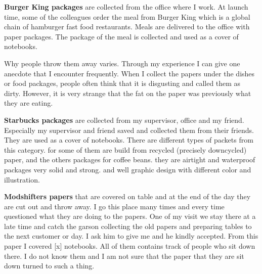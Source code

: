 






\textbf{Burger King packages} are collected from the office where I work. At launch time, some of the colleagues order the meal from Burger King which is a global chain of hamburger fast food restaurants. Meals are delivered to the office with paper packages. The package of the meal is collected and used as a cover of notebooks. 



Why people throw them away varies. Through my experience I can give one anecdote that I encounter frequently. When I collect the papers under the dishes or food packages, people often think that it is disgusting and called them as dirty. However, it is very strange that the fat on the paper was previously what they are eating.

\textbf{Starbucks packages} are collected from my supervisor, office and my friend. Especially my supervisor and friend saved and collected them from their friends. They are used as a cover of notebooks. There are different types of packets from this category. for some of them are build from recycled (precisely downcycled) paper, and the others packages for coffee beans. they are airtight and waterproof packages very solid and strong. and well graphic design with different color and illustration.

\textbf{Modshifters papers} that are covered on table and at the end of the day they are cut out and throw away. I go this place many times and every time questioned what they are doing to the papers. One of my visit we stay there at a late time and catch the garson collecting the old papers and preparing tables to the next customer or day. I ask him to give me and he kindly accepted. From this paper I covered [x] notebooks. All of them contains track of people who sit down there. I do not know them and I am not sure that the paper that they are sit down turned to such a thing.

